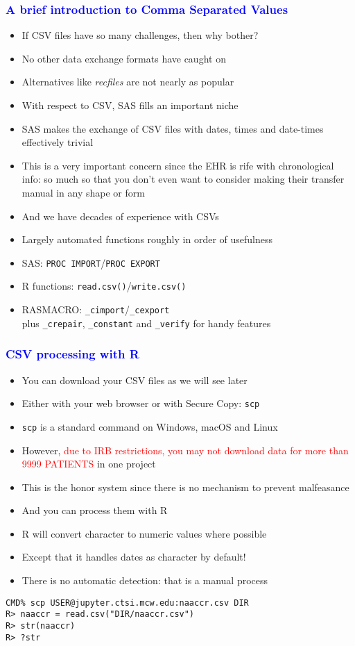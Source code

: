 \documentclass[11pt,pdftex,dvipsnames,usenames]{beamer}
\begin{document}
\begin{frame}[fragile]\frametitle{\bf\textcolor{blue}{A brief
introduction to Comma Separated Values}}

\begin{itemize}
\item If CSV files have so many challenges, then why bother?
\item No other data exchange formats have caught on
\item Alternatives like {\it recfiles} are not nearly as popular
\item With respect to CSV, SAS fills an important niche
\item SAS makes the exchange of CSV files with dates, times
and date-times effectively trivial
\item This is a very important concern since the EHR is rife
with chronological info: so much so that you don't even want to
consider making their transfer manual in any shape or form
\item And we have decades of experience with CSVs
\item Largely automated functions roughly in order of usefulness
\item SAS: \texttt{PROC IMPORT}/\texttt{PROC EXPORT}
\item R functions: \texttt{read.csv()}/\texttt{write.csv()}
\item RASMACRO: \texttt{\_cimport}/\texttt{\_cexport}\\
plus \texttt{\_crepair}, \texttt{\_constant}
and \texttt{\_verify} for handy features
\end{itemize}

\end{frame}

\begin{frame}[fragile]\frametitle{\bf\textcolor{blue}{CSV processing with R}}
\begin{itemize}
\item You can download your CSV files as we will see later
\item Either with your web browser or with Secure Copy: \texttt{scp}
\item \texttt{scp} is a standard command on Windows, macOS and Linux
\item However, \textcolor{red}{due to IRB restrictions, 
you may not download data
for more than 9999 PATIENTS} in one project
\item This is the honor system since there is no mechanism
to prevent malfeasance %
\item And you can process them with R
\item R will convert character to numeric values where possible
\item Except that it handles dates as character by default!
\item There is no automatic detection: that is a manual process
\end{itemize}
\begin{verbatim}
CMD% scp USER@jupyter.ctsi.mcw.edu:naaccr.csv DIR
R> naaccr = read.csv("DIR/naaccr.csv")
R> str(naaccr)
R> ?str
\end{verbatim}
\end{frame}
\end{document}

